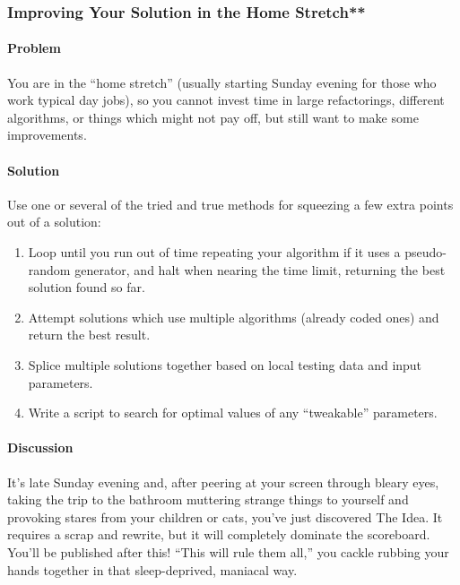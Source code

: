 \hypertarget{improving-your-solution-in-the-home-stretch}{%
\subsubsection{Improving Your Solution in the Home
Stretch**}\label{improving-your-solution-in-the-home-stretch}}

\hypertarget{problem-5}{%
\paragraph{Problem}\label{problem-5}}

You are in the ``home stretch'' (usually starting Sunday evening for
those who work typical day jobs), so you cannot invest time in large
refactorings, different algorithms, or things which might not pay off,
but still want to make some improvements.

\hypertarget{solution-5}{%
\paragraph{Solution}\label{solution-5}}

Use one or several of the tried and true methods for squeezing a few
extra points out of a solution:

\begin{enumerate}
\def\labelenumi{\arabic{enumi}.}
\item
  Loop until you run out of time repeating your algorithm if it uses a
  pseudo-random generator, and halt when nearing the time limit,
  returning the best solution found so far.
\item
  Attempt solutions which use multiple algorithms (already coded ones)
  and return the best result.
\item
  Splice multiple solutions together based on local testing data and
  input parameters.
\item
  Write a script to search for optimal values of any ``tweakable''
  parameters.
\end{enumerate}

\hypertarget{discussion-4}{%
\paragraph{Discussion}\label{discussion-4}}

It's late Sunday evening and, after peering at your screen through
bleary eyes, taking the trip to the bathroom muttering strange things to
yourself and provoking stares from your children or cats, you've just
discovered The Idea. It requires a scrap and rewrite, but it will
completely dominate the scoreboard. You'll be published after this!
``This will rule them all,'' you cackle rubbing your hands together in
that sleep-deprived, maniacal way.

